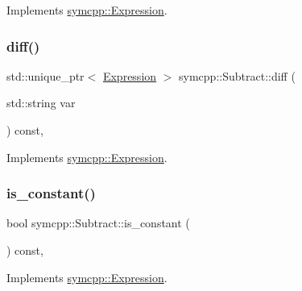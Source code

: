 Implements \mbox{\hyperlink{classsymcpp_1_1Expression_a2e7de5a295ccf0efdc9b34cea7ba3d0b}{symcpp\+::\+Expression}}.

\mbox{\label{classsymcpp_1_1Subtract_a4f9040e23694efcf093bf4b5c59b386b}} 
\subsubsection{\texorpdfstring{diff()}{diff()}}
{\footnotesize\ttfamily std\+::unique\+\_\+ptr$<$ \mbox{\hyperlink{classsymcpp_1_1Expression}{Expression}} $>$ symcpp\+::\+Subtract\+::diff (\begin{DoxyParamCaption}\item[{std\+::string}]{var }\end{DoxyParamCaption}) const\hspace{0.3cm}{\ttfamily [override]}, {\ttfamily [virtual]}}



Implements \mbox{\hyperlink{classsymcpp_1_1Expression_a032fe8da79d5e231ca2d21a201c8f32d}{symcpp\+::\+Expression}}.

\mbox{\label{classsymcpp_1_1Subtract_a651ca7fc5e804970141b65813e738463}} 
\subsubsection{\texorpdfstring{is\_constant()}{is\_constant()}}
{\footnotesize\ttfamily bool symcpp\+::\+Subtract\+::is\+\_\+constant (\begin{DoxyParamCaption}{ }\end{DoxyParamCaption}) const\hspace{0.3cm}{\ttfamily [override]}, {\ttfamily [virtual]}}



Implements \mbox{\hyperlink{classsymcpp_1_1Expression_a30db7917c8948e22330cbe8259caeae2}{symcpp\+::\+Expression}}.

\mbox{\label{classsymcpp_1_1Subtract_ac0b20c29aac75772aeb226eec86ffc22}} 

